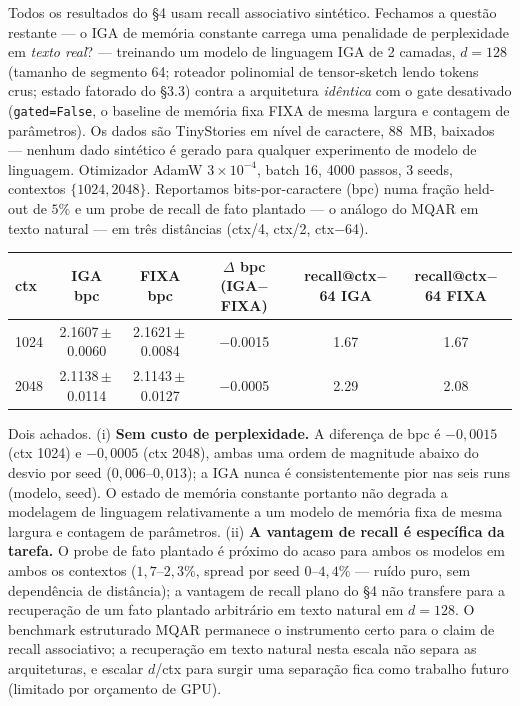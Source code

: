 \documentclass[11pt]{article}
\begin{document}
Todos os resultados do \S4 usam recall associativo sint\'etico. Fechamos a
quest\~ao restante --- o IGA de mem\'oria constante carrega uma penalidade de
perplexidade em \emph{texto real}? --- treinando um modelo de linguagem IGA de 2
camadas, $d=128$ (tamanho de segmento 64; roteador polinomial de tensor-sketch
lendo tokens crus; estado fatorado do \S3.3) contra a arquitetura
\emph{id\^entica} com o gate desativado (\texttt{gated=False}, o baseline de
mem\'oria fixa FIXA de mesma largura e contagem de par\^ametros). Os dados s\~ao
TinyStories em n\'ivel de caractere, 88~MB, baixados --- nenhum dado sint\'etico
\'e gerado para qualquer experimento de modelo de linguagem. Otimizador AdamW
$3\times10^{-4}$, batch 16, 4000 passos, 3 seeds, contextos $\{1024, 2048\}$.
Reportamos bits-por-caractere (bpc) numa fra\c{c}\~ao held-out de $5\%$ e um probe
de recall de fato plantado --- o an\'alogo do MQAR em texto natural --- em
tr\^es dist\^ancias (ctx/4, ctx/2, ctx$-$64).

\begin{table}[h]\centering
\begin{tabular}{lccccc}
\toprule
ctx & IGA bpc & FIXA bpc & $\Delta$ bpc (IGA$-$FIXA) & recall@ctx$-$64 IGA & recall@ctx$-$64 FIXA \\
\midrule
1024 & 2.1607\,$\pm$\,0.0060 & 2.1621\,$\pm$\,0.0084 & $-$0.0015 & 1.67 & 1.67 \\
2048 & 2.1138\,$\pm$\,0.0114 & 2.1143\,$\pm$\,0.0127 & $-$0.0005 & 2.29 & 2.08 \\
\bottomrule
\end{tabular}
\end{table}

Dois achados. (i) \textbf{Sem custo de perplexidade.} A diferen\c{c}a de bpc \'e
$-0{,}0015$ (ctx 1024) e $-0{,}0005$ (ctx 2048), ambas uma ordem de magnitude
abaixo do desvio por seed ($0{,}006$--$0{,}013$); a IGA nunca \'e
consistentemente pior nas seis runs (modelo, seed). O estado de mem\'oria
constante portanto n\~ao degrada a modelagem de linguagem relativamente a um
modelo de mem\'oria fixa de mesma largura e contagem de par\^ametros. (ii)
\textbf{A vantagem de recall \'e espec\'ifica da tarefa.} O probe de fato
plantado \'e pr\'oximo do acaso para ambos os modelos em ambos os contextos
($1{,}7$--$2{,}3\%$, spread por seed $0$--$4{,}4\%$ --- ru\'ido puro, sem
depend\^encia de dist\^ancia); a vantagem de recall plano do \S4 n\~ao transfere
para a recupera\c{c}\~ao de um fato plantado arbitr\'ario em texto natural em
$d=128$. O benchmark estruturado MQAR permanece o instrumento certo para o claim
de recall associativo; a recupera\c{c}\~ao em texto natural nesta escala n\~ao
separa as arquiteturas, e escalar $d$/ctx para surgir uma separa\c{c}\~ao fica
como trabalho futuro (limitado por or\c{c}amento de GPU).
\end{document}
